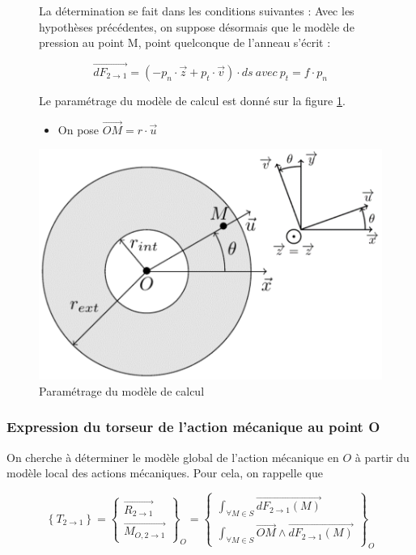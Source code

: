 \begin{figure}[ht!]
\begin{minipage}{0.55\linewidth}
La détermination se fait dans les conditions suivantes :
Avec les hypothèses précédentes, on suppose désormais que le modèle de pression au point M, point quelconque de l'anneau s'écrit :

$$\overrightarrow{dF_{2\rightarrow 1}}=(-p_n\cdot \vec{z}+p_t\cdot \vec{v})\cdot ds\ avec\ p_t=f\cdot p_n$$

Le paramétrage du modèle de calcul est donné sur la figure \ref{fig15}.

\begin{itemize}
 \item On pose $\overrightarrow{OM}=r\cdot \vec{u}$
\end{itemize}

\end{minipage}\hfill
\begin{minipage}{0.55\linewidth}
\centering\includegraphics[width=0.8\linewidth]{img/fig15}
\caption{\label{fig15}Paramétrage du modèle de calcul}
\end{minipage}
\end{figure}

\subsubsection{Expression du torseur de l'action mécanique au point O}

On cherche à déterminer le modèle global de l'action mécanique en $O$ à partir du modèle local des actions mécaniques. Pour cela, on rappelle que 

$$\left\{T_{2\rightarrow 1}\right\}=\left\{\begin{array}{c}\overrightarrow{R_{2\rightarrow 1}}\\\overrightarrow{M_{O,2\rightarrow 1}}\end{array}\right\}_O=\left\{\begin{array}{c}\int_{\forall M\in S} \overrightarrow{dF_{2\rightarrow 1}(M)}\\\int_{\forall M\in S} \overrightarrow{OM}\wedge\overrightarrow{dF_{2\rightarrow 1}(M)}\end{array}\right\}_O$$

